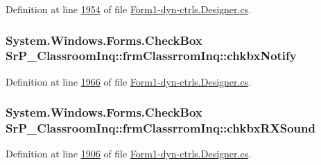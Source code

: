 \-Definition at line \hyperlink{_form1-dyn-ctrls_8_designer_8cs_source_l01954}{1954} of file \hyperlink{_form1-dyn-ctrls_8_designer_8cs_source}{\-Form1-\/dyn-\/ctrls.\-Designer.\-cs}.

\hypertarget{class_sr_p___classroom_inq_1_1frm_classrrom_inq_a86f98a8c743985a65d129f24ed240ba6}{
\subsubsection[{chkbx\-Notify}]{\setlength{\rightskip}{0pt plus 5cm}\-System.\-Windows.\-Forms.\-Check\-Box {\bf \-Sr\-P\-\_\-\-Classroom\-Inq\-::frm\-Classrrom\-Inq\-::chkbx\-Notify}}}
\label{class_sr_p___classroom_inq_1_1frm_classrrom_inq_a86f98a8c743985a65d129f24ed240ba6}


\-Definition at line \hyperlink{_form1-dyn-ctrls_8_designer_8cs_source_l01966}{1966} of file \hyperlink{_form1-dyn-ctrls_8_designer_8cs_source}{\-Form1-\/dyn-\/ctrls.\-Designer.\-cs}.

\hypertarget{class_sr_p___classroom_inq_1_1frm_classrrom_inq_af7626aaecde3bb58d5cfee3957410aa8}{
\subsubsection[{chkbx\-R\-X\-Sound}]{\setlength{\rightskip}{0pt plus 5cm}\-System.\-Windows.\-Forms.\-Check\-Box {\bf \-Sr\-P\-\_\-\-Classroom\-Inq\-::frm\-Classrrom\-Inq\-::chkbx\-R\-X\-Sound}}}
\label{class_sr_p___classroom_inq_1_1frm_classrrom_inq_af7626aaecde3bb58d5cfee3957410aa8}


\-Definition at line \hyperlink{_form1-dyn-ctrls_8_designer_8cs_source_l01906}{1906} of file \hyperlink{_form1-dyn-ctrls_8_designer_8cs_source}{\-Form1-\/dyn-\/ctrls.\-Designer.\-cs}.

